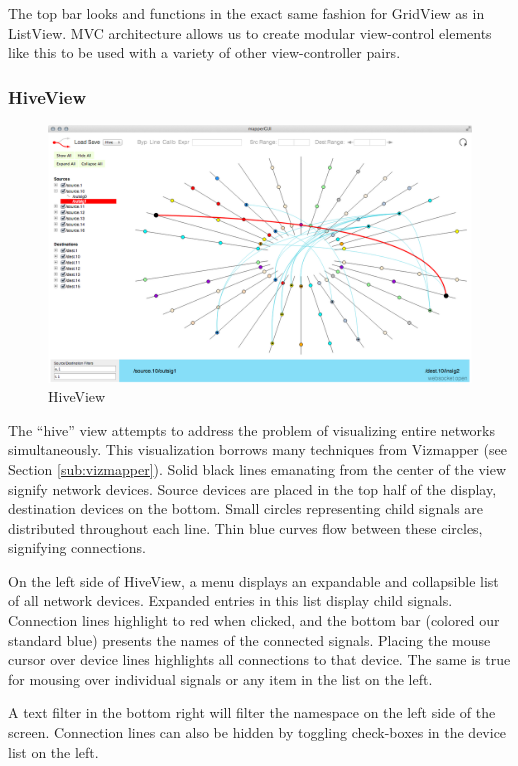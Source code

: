 The top bar looks and functions in the exact same fashion for GridView as in ListView. MVC architecture allows us to create modular view-control elements like this to be used with a variety of other view-controller pairs.

	\subsubsection{HiveView}

\begin{figure}[ht]
\centering
	\includegraphics[width=\textwidth]{figures/hive}
\caption{HiveView}
\label{fig:hive}
\end{figure}
	
The ``hive'' view attempts to address the problem of visualizing entire networks simultaneously. This visualization borrows many techniques from Vizmapper (see Section \ref{sub:vizmapper}). Solid black lines emanating from the center of the view signify network devices. Source devices are placed in the top half of the display, destination devices on the bottom. Small circles representing child signals are distributed throughout each line. Thin blue curves flow between these circles, signifying connections. 

On the left side of HiveView, a menu displays an expandable and collapsible list of all network devices. Expanded entries in this list display child signals. Connection lines highlight to red when clicked, and the bottom bar (colored our standard blue) presents the names of the connected signals. Placing the mouse cursor over device lines highlights all connections to that device. The same is true for mousing over individual signals or any item in the list on the left.

A text filter in the bottom right will filter the namespace on the left side of the screen. Connection lines can also be hidden by toggling check-boxes in the device list on the left.

